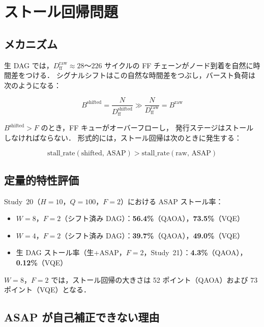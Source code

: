 \documentclass[journal,10pt,twocolumn]{IEEEtran}
\begin{document}
\section{ストール回帰問題}

\subsection{メカニズム}

生 DAG では，$D_{\mathrm{ff}}^{\mathrm{raw}} \approx 28$〜$226$ サイクルの
FF チェーンがノード到着を自然に時間差をつける．
シグナルシフトはこの自然な時間差をつぶし，バースト負荷は次のようになる：

\begin{equation}
  B^{\mathrm{shifted}} = \frac{N}{D_{\mathrm{ff}}^{\mathrm{shifted}}}
  \gg \frac{N}{D_{\mathrm{ff}}^{\mathrm{raw}}} = B^{\mathrm{raw}}
\end{equation}

$B^{\mathrm{shifted}} > F$ のとき，FF キューがオーバーフローし，
発行ステージはストールしなければならない．
形式的には，ストール回帰は次のときに発生する：

\begin{equation}
  \mathrm{stall\_rate}(\text{shifted, ASAP}) >
  \mathrm{stall\_rate}(\text{raw, ASAP})
\end{equation}

\subsection{定量的特性評価}

Study~20（$H=10$，$Q=100$，$F=2$）における ASAP ストール率：
\begin{itemize}
\item $W=8$，$F=2$（シフト済み DAG）：\textbf{56.4\%}（QAOA），\textbf{73.5\%}（VQE）
\item $W=4$，$F=2$（シフト済み DAG）：\textbf{39.7\%}（QAOA），\textbf{49.0\%}（VQE）
\item 生 DAG ストール率（生+ASAP，$F=2$，Study~21）：\textbf{4.3\%}（QAOA），\textbf{0.12\%}（VQE）
\end{itemize}

$W=8$，$F=2$ では，ストール回帰の大きさは 52 ポイント（QAOA）および
73 ポイント（VQE）となる．

\subsection{ASAP が自己補正できない理由}
\end{document}
